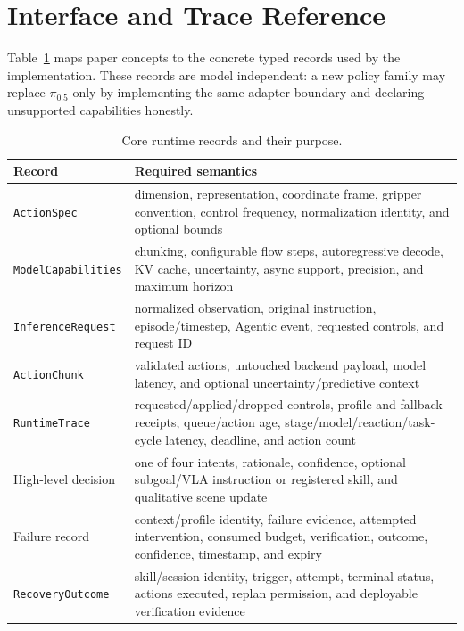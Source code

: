 \documentclass[runningheads]{waica}
\newcommand{\pizero}{$\pi_{0.5}$}
\begin{document}
\appendix

\section{Interface and Trace Reference}
\label{app:interfaces}

Table~\ref{tab:interfaces} maps paper concepts to the concrete typed records
used by the implementation. These records are model independent: a new policy
family may replace \pizero{} only by implementing the same adapter boundary and
declaring unsupported capabilities honestly.

\begin{table}
\caption{Core runtime records and their purpose.}
\label{tab:interfaces}
\centering
\small
\begin{tabularx}{\textwidth}{p{}X}
\toprule
Record & Required semantics \\
\midrule
\texttt{ActionSpec} & dimension, representation, coordinate frame, gripper convention, control frequency, normalization identity, and optional bounds \\
\texttt{ModelCapabilities} & chunking, configurable flow steps, autoregressive decode, KV cache, uncertainty, async support, precision, and maximum horizon \\
\texttt{InferenceRequest} & normalized observation, original instruction, episode/timestep, Agentic event, requested controls, and request ID \\
\texttt{ActionChunk} & validated actions, untouched backend payload, model latency, and optional uncertainty/predictive context \\
\texttt{RuntimeTrace} & requested/applied/dropped controls, profile and fallback receipts, queue/action age, stage/model/reaction/task-cycle latency, deadline, and action count \\
High-level decision & one of four intents, rationale, confidence, optional subgoal/VLA instruction or registered skill, and qualitative scene update \\
Failure record & context/profile identity, failure evidence, attempted intervention, consumed budget, verification, outcome, confidence, timestamp, and expiry \\
\texttt{RecoveryOutcome} & skill/session identity, trigger, attempt, terminal status, actions executed, replan permission, and deployable verification evidence \\
\bottomrule
\end{tabularx}
\end{table}
\end{document}
